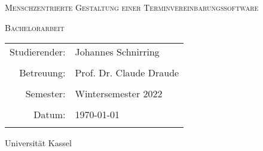 \documentclass[12pt]{article}
\title{\thesisTitle}
\author{Johannes Schnirring}
\newcommand{\thesisTitle}{Menschzentrierte Gestaltung einer Terminvereinbarungssoftware}
\begin{document}
\begin{titlepage}
    \centering
    {\scshape\LARGE \thesisTitle \par}
    \vspace{1cm}

    {\scshape\Large Bachelorarbeit\par}
    \vspace{1.5cm}

    \begin{tabular}{r l}
        {\Large Studierender:} & {\Large Johannes Schnirring}             \\ \\
        {\Large Betreuung:}    & {\Large Prof. Dr. Claude Draude        } \\ \\
        {\Large Semester:}     & {\Large Wintersemester 2022}             \\ \\
        {\Large Datum:}        & {\Large \today}                          \\ \\
    \end{tabular}
    \vfill
    {\large Universität Kassel}


\end{titlepage}

\tableofcontents
\newpage







\newpage



\end{document}

